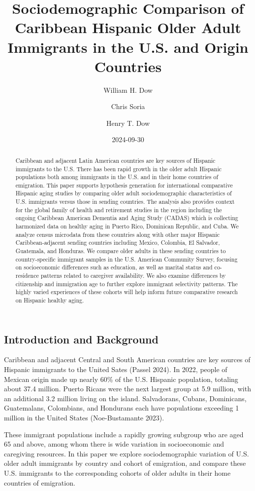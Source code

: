 \documentclass[
]{article}
\title{Sociodemographic Comparison of Caribbean Hispanic Older Adult
Immigrants in the U.S. and Origin Countries}
\author{William H. Dow \and Chris Soria \and Henry T. Dow}
\date{2024-09-30}
\begin{document}
\maketitle
\begin{abstract}
Caribbean and adjacent Latin American countries are key sources of
Hispanic immigrants to the U.S. There has been rapid growth in the older
adult Hispanic populations both among immigrants in the U.S. and in
their home countries of emigration. This paper supports hypothesis
generation for international comparative Hispanic aging studies by
comparing older adult sociodemographic characteristics of U.S.
immigrants versus those in sending countries. The analysis also provides
context for the global family of health and retirement studies in the
region including the ongoing Caribbean American Dementia and Aging Study
(CADAS) which is collecting harmonized data on healthy aging in Puerto
Rico, Dominican Republic, and Cuba. We analyze census microdata from
these countries along with other major Hispanic Caribbean-adjacent
sending countries including Mexico, Colombia, El Salvador, Guatemala,
and Honduras. We compare older adults in these sending countries to
country-specific immigrant samples in the U.S. American Community
Survey, focusing on socioeconomic differences such as education, as well
as marital status and co-residence patterns related to caregiver
availability. We also examine differences by citizenship and immigration
age to further explore immigrant selectivity patterns. The highly varied
experiences of these cohorts will help inform future comparative
research on Hispanic healthy aging.
\end{abstract}


\subsection{Introduction and Background}\label{sec-intro}

Caribbean and adjacent Central and South American countries are key
sources of Hispanic immigrants to the United Sates (Passel 2024). In
2022, people of Mexican origin made up nearly 60\% of the U.S. Hispanic
population, totaling about 37.4 million. Puerto Ricans were the next
largest group at 5.9 million, with an additional 3.2 million living on
the island. Salvadorans, Cubans, Dominicans, Guatemalans, Colombians,
and Hondurans each have populations exceeding 1 million in the United
States (Noe-Bustamante 2023).

These immigrant populations include a rapidly growing subgroup who are
aged 65 and above, among whom there is wide variation in socioeconomic
and caregiving resources. In this paper we explore sociodemographic
variation of U.S. older adult immigrants by country and cohort of
emigration, and compare these U.S. immigrants to the corresponding
cohorts of older adults in their home countries of emigration.
\end{document}
